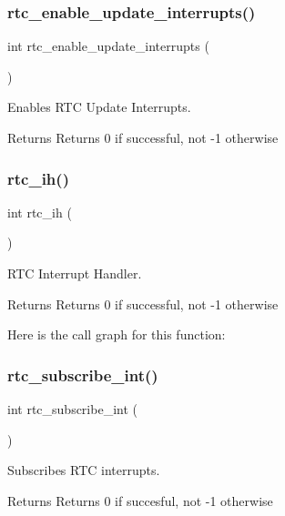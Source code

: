 \subsubsection{\texorpdfstring{rtc\_enable\_update\_interrupts()}{rtc\_enable\_update\_interrupts()}}
{\footnotesize\ttfamily int rtc\+\_\+enable\+\_\+update\+\_\+interrupts (\begin{DoxyParamCaption}{ }\end{DoxyParamCaption})}



Enables R\+TC Update Interrupts. 

\begin{DoxyReturn}{Returns}
Returns 0 if successful, not -\/1 otherwise 
\end{DoxyReturn}
\mbox{\label{group__rtc_ga57f7116af216e3779ad9d6e98351d329}} 
\subsubsection{\texorpdfstring{rtc\_ih()}{rtc\_ih()}}
{\footnotesize\ttfamily int rtc\+\_\+ih (\begin{DoxyParamCaption}{ }\end{DoxyParamCaption})}



R\+TC Interrupt Handler. 

\begin{DoxyReturn}{Returns}
Returns 0 if successful, not -\/1 otherwise 
\end{DoxyReturn}
Here is the call graph for this function\+:
\mbox{\label{group__rtc_gabd8de825e876e8ef94c64ac616f68a11}} 
\subsubsection{\texorpdfstring{rtc\_subscribe\_int()}{rtc\_subscribe\_int()}}
{\footnotesize\ttfamily int rtc\+\_\+subscribe\+\_\+int (\begin{DoxyParamCaption}{ }\end{DoxyParamCaption})}



Subscribes R\+TC interrupts. 

\begin{DoxyReturn}{Returns}
Returns 0 if succesful, not -\/1 otherwise 
\end{DoxyReturn}
\mbox{\label{group__rtc_gab8f17bf5280c908c8b199a90fefcc758}} 
